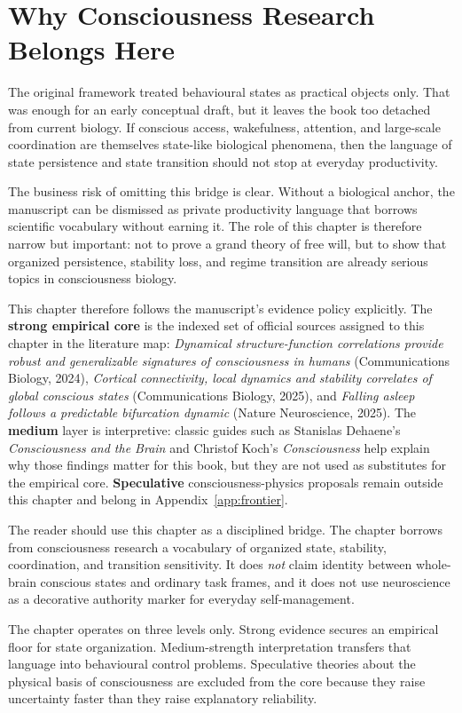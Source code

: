 \section{Why Consciousness Research Belongs Here}

The original framework treated behavioural states as practical objects only.
That was enough for an early conceptual draft, but it leaves the book too
detached from current biology. If conscious access, wakefulness, attention,
and large-scale coordination are themselves state-like biological phenomena,
then the language of state persistence and state transition should not stop at
everyday productivity.

The business risk of omitting this bridge is clear. Without a biological
anchor, the manuscript can be dismissed as private productivity language that
borrows scientific vocabulary without earning it. The role of this chapter is
therefore narrow but important: not to prove a grand theory of free will, but
to show that organized persistence, stability loss, and regime transition are
already serious topics in consciousness biology.

This chapter therefore follows the manuscript's evidence policy explicitly. The
\textbf{strong empirical core} is the indexed set of official sources assigned
to this chapter in the literature map: \emph{Dynamical structure-function
correlations provide robust and generalizable signatures of consciousness in
humans} (Communications Biology, 2024),
\emph{Cortical connectivity, local dynamics and stability correlates of global
conscious states} (Communications Biology, 2025), and
\emph{Falling asleep follows a predictable bifurcation dynamic}
(Nature Neuroscience, 2025). The \textbf{medium} layer is interpretive:
classic guides such as Stanislas Dehaene's \emph{Consciousness and the Brain}
and Christof Koch's \emph{Consciousness} help explain why those findings
matter for this book, but they are not used as substitutes for the empirical
core. \textbf{Speculative} consciousness-physics proposals remain outside this
chapter and belong in Appendix~\ref{app:frontier}.

\begin{discussion}
The reader should use this chapter as a disciplined bridge. The chapter borrows
from consciousness research a vocabulary of organized state, stability,
coordination, and transition sensitivity. It does \emph{not} claim identity
between whole-brain conscious states and ordinary task frames, and it does not
use neuroscience as a decorative authority marker for everyday self-management.
\end{discussion}

\begin{remark}
The chapter operates on three levels only. Strong evidence secures an empirical
floor for state organization. Medium-strength interpretation transfers that
language into behavioural control problems. Speculative theories about the
physical basis of consciousness are excluded from the core because they raise
uncertainty faster than they raise explanatory reliability.
\end{remark}
